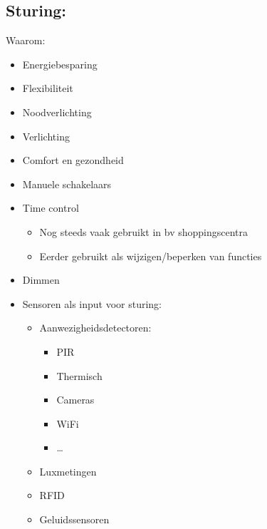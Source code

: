 \documentclass[12pt]{article}
\begin{document}
\subsection{Sturing:}
Waarom:\begin{itemize}
    \item Energiebesparing 
    \item Flexibiliteit 
    \item Noodverlichting 
    \item Verlichting 
    \item Comfort en gezondheid
\end{itemize}
\begin{itemize}
    \item Manuele schakelaars
    \item Time control\begin{itemize}
        \item Nog steeds vaak gebruikt in bv shoppingscentra
        \item Eerder gebruikt als wijzigen/beperken van functies
    \end{itemize}
    \item Dimmen
    \item Sensoren als input voor sturing:\begin{itemize}
        \item Aanwezigheidsdetectoren:\begin{itemize}
            \item PIR
            \item Thermisch
            \item Cameras
            \item WiFi 
            \item \dots
        \end{itemize}
    \item Luxmetingen 
    \item RFID 
    \item Geluidssensoren
    \end{itemize}
\end{itemize}
\end{document}
